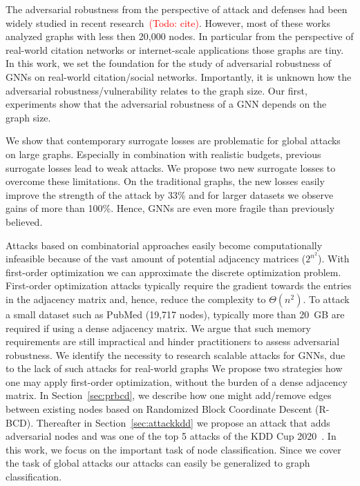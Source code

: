 \documentclass[sigconf,authordraft]{acmart}
\newcommand{\todo}[1]{\textcolor{red}{(Todo: #1)}}
\begin{document}
The adversarial robustness from the perspective of attack and defenses had been widely studied in recent research~\todo{cite}. However, most of these works analyzed graphs with less then 20,000 nodes. In particular from the perspective of real-world citation networks or internet-scale applications those graphs are tiny. In this work, we set the foundation for the study of adversarial robustness of GNNs on real-world citation/social networks. Importantly, it is unknown how the adversarial robustness/vulnerability relates to the graph size. Our first, experiments show that the adversarial robustness of a GNN depends on the graph size.

We show that contemporary surrogate losses are problematic for global attacks on large graphs. Especially in combination with realistic budgets, previous surrogate losses lead to weak attacks. We propose two new surrogate losses to overcome these limitations. On the traditional graphs, the new losses easily improve the strength of the attack by 33\% and for larger datasets we observe gains of more than 100\%. Hence, GNNs are even more fragile than previously believed.

Attacks based on combinatorial approaches easily become computationally infeasible because of the vast amount of potential adjacency matrices (\(2^{n^2}\)). With first-order optimization we can approximate the discrete optimization problem. First-order optimization attacks typically require the gradient towards the entries in the adjacency matrix and, hence, reduce the complexity to \(\Theta(n^2)\). To attack a small dataset such as PubMed (19,717 nodes), typically more than 20~GB are required if using a dense adjacency matrix. We argue that such memory requirements are still impractical and hinder practitioners to assess adversarial robustness. We identify the necessity to research scalable attacks for GNNs, due to the lack of such attacks for real-world graphs We propose two strategies how one may apply first-order optimization, without the burden of a dense adjacency matrix. In Section~\ref{sec:prbcd}, we describe how one might add/remove edges between existing nodes based on Randomized Block Coordinate Descent (R-BCD). Thereafter in Section~\ref{sec:attackkdd} we propose an attack that adds adversarial nodes and was one of the top 5 attacks of the KDD Cup 2020~\citep{Biendata2020}. In this work, we focus on the important task of node classification. Since we cover the task of global attacks our attacks can easily be generalized to graph classification.
\end{document}
